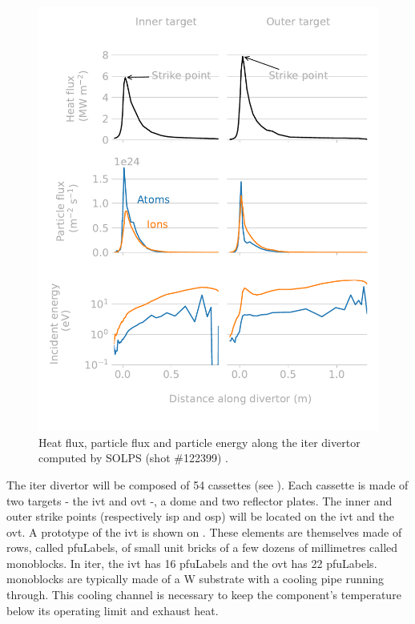 \begin{figure} [h]
    \centering
    \includegraphics[width=\linewidth]{Figures/Chapter1/divertor_exposure_conditions.pdf}
    \caption{Heat flux, particle flux and particle energy along the \acrshort{iter} divertor computed by SOLPS (shot \#122399) \cite{pitts_physics_2019}.}
\end{figure}

The \acrshort{iter} divertor will be composed of 54 cassettes (see ).
Each cassette is made of two targets - the \gls{ivt} and \gls{ovt} -, a dome and two reflector plates.
The inner and outer \glspl{strike point} (respectively \acrshort{isp} and \acrshort{osp}) will be located on the \gls{ivt} and the \gls{ovt}.
A prototype of the \gls{ivt} is shown on .
These elements are themselves made of rows, called \glspl{pfuLabel}, of small unit bricks of a few dozens of millimetres called \glspl{monoblock}.
In \acrshort{iter}, the \gls{ivt} has 16 \glspl{pfuLabel} and the \gls{ovt} has 22 \glspl{pfuLabel}.
\Glspl{monoblock} are typically made of a \Gls{W} substrate with a cooling pipe running through.
This cooling channel is necessary to keep the component's temperature below its operating limit and exhaust heat.

